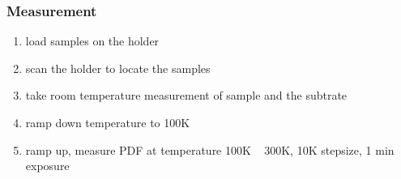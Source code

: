 \documentclass[prl,aps,tighten,amsmath,amssymb,floatfix]{revtex4-1}
\begin{document}
\subsubsection{Measurement}
\begin{enumerate}

\item load samples on the holder

\item scan the holder to locate the samples

\item take room temperature measurement of sample and the subtrate

\item ramp down temperature to 100K

\item ramp up, measure PDF at temperature 100K ~ 300K, 10K stepsize, 1 min exposure

\end{enumerate}
\end{document}
